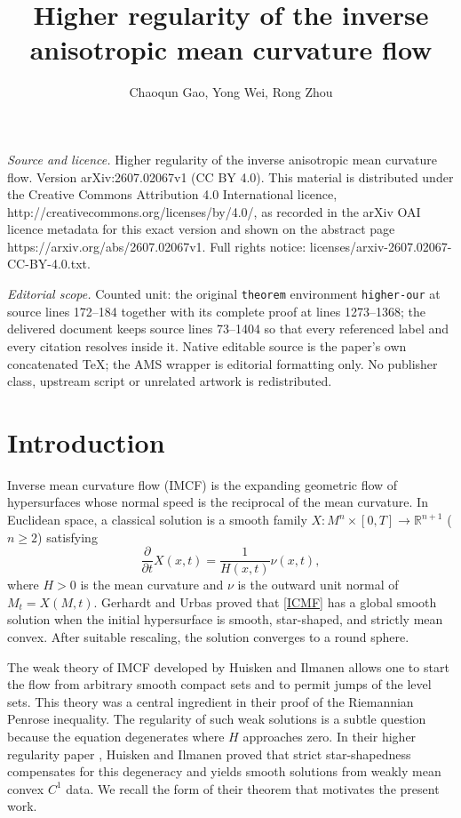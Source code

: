 \documentclass[10pt,a4paper]{amsart}
\numberwithin{equation}{section}
\begin{document}
\title[Higher regularity of the inverse anisotropic mean curvature ]{Higher regularity of the inverse anisotropic mean curvature flow}
\author{Chaoqun Gao, Yong Wei, Rong Zhou}
\date{}
\maketitle
\noindent\emph{Source and licence.} Higher regularity of the inverse anisotropic mean curvature flow. Version arXiv:2607.02067v1 (CC BY 4.0). This material is distributed under the Creative Commons Attribution 4.0 International licence, http://creativecommons.org/licenses/by/4.0/, as recorded in the arXiv OAI licence metadata for this exact version and shown on the abstract page https://arxiv.org/abs/2607.02067v1. Full rights notice: licenses/arxiv-2607.02067-CC-BY-4.0.txt.\par\smallskip
\noindent\textit{Editorial scope.} Counted unit: the original \texttt{theorem} environment \texttt{higher-our} at source lines 172--184 together with its complete proof at lines 1273--1368; the delivered document keeps source lines 73--1404 so that every referenced label and every citation resolves inside it. Native editable source is the paper's own concatenated TeX; the AMS wrapper is editorial formatting only. No publisher class, upstream script or unrelated artwork is redistributed.
	\section{Introduction}
	\label{section1}
	Inverse mean curvature flow (IMCF) is the expanding geometric flow of hypersurfaces whose normal speed is the reciprocal of the mean curvature. In Euclidean space, a classical solution is a smooth family $X:M^n\times[0,T]\to \mathbb{R}^{n+1}$ ($n\geq 2$) satisfying
	\begin{equation}
		\label{ICMF}
		\frac{\partial }{\partial t}X(x,t)=\frac{1}{H(x,t)}\nu(x,t), 
	\end{equation}
	where $H>0$ is the mean curvature and $\nu$ is the outward unit normal of $M_t=X(M,t)$. Gerhardt \cite{G90} and Urbas \cite{U90} proved that \eqref{ICMF} has a global smooth solution when the initial hypersurface is smooth, star-shaped, and strictly mean convex. After suitable rescaling, the solution converges to a round sphere.
	
	The weak theory of IMCF developed by Huisken and Ilmanen \cite{HI01} allows one to start the flow from arbitrary smooth compact sets and to permit jumps of the level sets. This theory was a central ingredient in their proof of the Riemannian Penrose inequality. The regularity of such weak solutions is a subtle question because the equation degenerates where $H$ approaches zero. In their higher regularity paper \cite{HI08}, Huisken and Ilmanen proved that strict star-shapedness compensates for this degeneracy and yields smooth solutions from weakly mean convex $C^1$ data. We recall the form of their theorem that motivates the present work.
	
\end{document}
